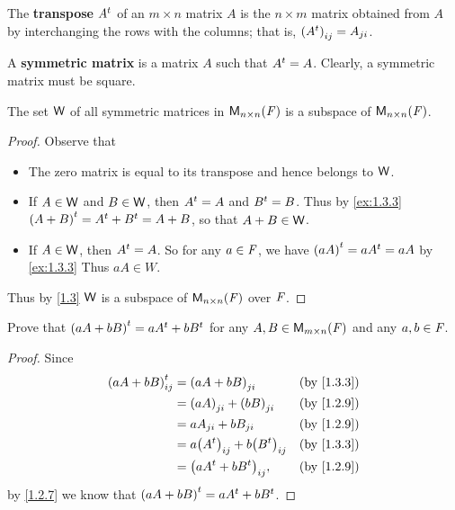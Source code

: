\begin{defn}\label{1.3.3}
  The \textbf{transpose} \({A}^{t}\) of an \(m \times n\) matrix \(A\) is the \(n \times m\) matrix obtained from \(A\) by interchanging the rows with the columns;
  that is, \(\left\lparen{A}^{t}\right\rparen_{i j} = A_{j i}\).
\end{defn}

\begin{defn}\label{1.3.4}
  A \textbf{symmetric matrix} is a matrix \(A\) such that \({A}^{t} = A\).
  Clearly, a symmetric matrix must be square.
\end{defn}

\begin{eg}\label{1.3.5}
  The set \(\mathsf{W}\) of all symmetric matrices in \(\mathsf{M}_{{n} \times n}({\mathit{F}})\) is a subspace of \(\mathsf{M}_{{n} \times n}({\mathit{F}})\).
\end{eg}

\begin{proof}
  Observe that
  \begin{itemize}
    \item The zero matrix is equal to its transpose and hence belongs to \(\mathsf{W}\).
    \item If \(A \in \mathsf{W}\) and \(B \in \mathsf{W}\), then \({A}^{t} = A\) and \({B}^{t} = B\).
          Thus by \cref{ex:1.3.3} \({\left\lparen A + B\right\rparen}^{t} = {A}^{t} + {B}^{t} = A + B\), so that \(A + B \in \mathsf{W}\).
    \item If \(A \in \mathsf{W}\), then \({A}^{t} = A\).
          So for any \(a \in \mathit{F}\), we have \({\left\lparen aA\right\rparen}^{t} = a{A}^{t} = aA\) by \cref{ex:1.3.3}
          Thus \(aA \in W\).
  \end{itemize}
  Thus by \cref{1.3} \(\mathsf{W}\) is a subspace of \(\mathsf{M}_{{n} \times n}({\mathit{F}})\) over \(\mathit{F}\).
\end{proof}

\exercisesection

\setcounter{ex}{2}
\begin{ex}\label{ex:1.3.3}
  Prove that \({\left\lparen aA + bB\right\rparen}^{t} = a{A}^{t} + b{B}^{t}\) for any \(A, B \in \mathsf{M}_{{m} \times n}({\mathit{F}})\) and any \(a, b \in \mathit{F}\).
\end{ex}

\begin{proof}
  Since
  \begin{align*}
    \tp{\p{aA + bB}}_{i j} & = \p{aA + bB}_{j i}                     &  & \text{(by \cref{1.3.3})} \\
                           & = \p{aA}_{j i} + \p{bB}_{j i}           &  & \text{(by \cref{1.2.9})} \\
                           & = aA_{j i} + bB_{j i}                   &  & \text{(by \cref{1.2.9})} \\
                           & = a\p{\tp{A}}_{i j} + b\p{\tp{B}}_{i j} &  & \text{(by \cref{1.3.3})} \\
                           & = \p{a\tp{A} + b\tp{B}}_{i j},          &  & \text{(by \cref{1.2.9})}
  \end{align*}
  by \cref{1.2.7} we know that \({\left\lparen aA + bB\right\rparen}^{t} = a{A}^{t} + b{B}^{t}\).
\end{proof}